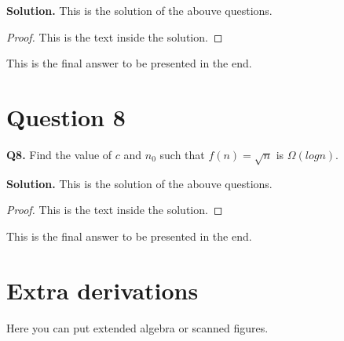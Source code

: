 \documentclass[11pt]{article}
\begin{document}
\textbf{Solution. } This is the solution of the abouve questions. 
\begin{proof}
This is the text inside the solution. 
\end{proof}

\begin{finalanswer}
This is the final answer to be presented in the end. 
\end{finalanswer}

\section{Question 8}
\textbf{Q8.} Find the value of $c$ and $n_0$ such that $f(n) = \sqrt{n}$ is $\Omega(log n)$. 

\textbf{Solution. } This is the solution of the abouve questions. 
\begin{proof}
This is the text inside the solution. 
\end{proof}

\begin{finalanswer}
This is the final answer to be presented in the end. 
\end{finalanswer}



\appendix
\section{Extra derivations}
Here you can put extended algebra or scanned figures.
\end{document}
